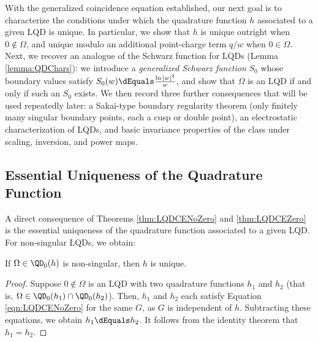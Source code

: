 \documentclass{article}
\numberwithin{equation}{section}
\begin{document}
With the generalized coincidence equation established, our next goal is to characterize the conditions under which the quadrature function $h$ associated to a given LQD is unique. In particular, we show that $h$ is unique outright when $0\notin\Omega$, and unique modulo an additional point-charge term $q/w$ when $0\in\Omega$. Next, we recover an analogue of the Schwarz function for LQDs (Lemma \ref{lemma:QDChars}): we introduce a \emph{generalized Schwarz function} $S_0$ whose boundary values satisfy $S_0(w)\dEquals\frac{\ln|w|^2}{w}$, and show that $\Omega$ is an LQD if and only if such an $S_0$ exists. We then record three further consequences that will be used repeatedly later: a Sakai-type boundary regularity theorem (only finitely many singular boundary points, each a cusp or double point), an electrostatic characterization of LQDs, and basic invariance properties of the class under scaling, inversion, and power maps.



\subsection{Essential Uniqueness of the Quadrature Function}
A direct consequence of Theorems \ref{thm:LQDCENoZero} and \ref{thm:LQDCEZero} is the essential uniqueness of the quadrature function associated to a given LQD. For non-singular LQDs, we obtain:
\begin{corollary}\label{cor:LQDQuadFuncUniquenessNoZero}
    If $\Omega\in\QD_0(h)$ is non-singular, then $h$ is unique.
\end{corollary}
\begin{proof}
Suppose $0\notin\Omega$ is an LQD with two quadrature functions $h_1$ and $h_2$ (that is, $\Omega\in\QD_0(h_1)\cap\QD_0(h_2)$). Then, $h_1$ and $h_2$ each satisfy Equation \ref{eqn:LQDCENoZero} for the same $G$, as $G$ is independent of $h$. Subtracting these equations, we obtain $h_1\dEquals h_2$. It follows from the identity theorem that $h_1=h_2$. 
\end{proof}
\end{document}
